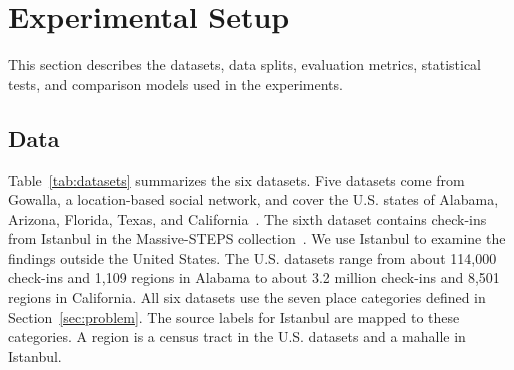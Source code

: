 \section{Experimental Setup}
\label{sec:setup}

This section describes the datasets, data splits, evaluation metrics, statistical tests, and comparison models used in the experiments.

\subsection{Data}
\label{sec:setup-data}
Table~\ref{tab:datasets} summarizes the six datasets. Five datasets come from Gowalla, a location-based social network, and cover the U.S. states of Alabama, Arizona, Florida, Texas, and California~\cite{cho2011gowalla}. The sixth dataset contains check-ins from Istanbul in the Massive-STEPS collection~\cite{wongso2025massivesteps}. We use Istanbul to examine the findings outside the United States.
The U.S. datasets range from about 114,000 check-ins and 1,109 regions in Alabama to about 3.2 million check-ins and 8,501 regions in California. All six datasets use the seven place categories defined in Section~\ref{sec:problem}. The source labels for Istanbul are mapped to these categories. A region is a census tract in the U.S. datasets and a mahalle in Istanbul.

